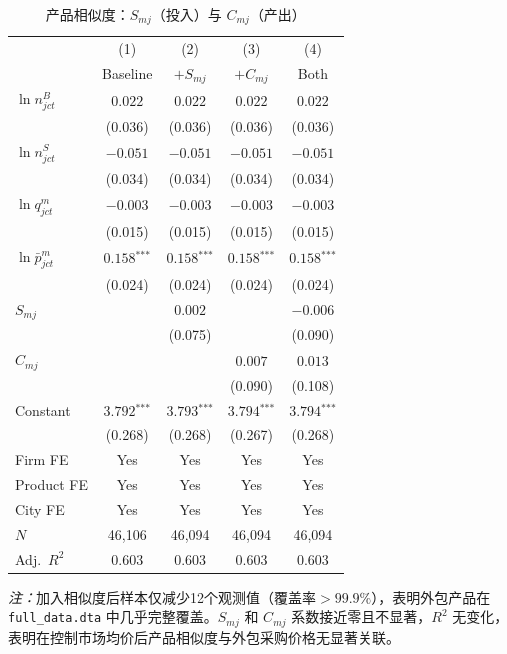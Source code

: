 \documentclass[12pt]{article}
\newcommand{\sym}[1]{\ensuremath{^{\text{#1}}}}
\newcommand{\se}[1]{{\small(#1)}}
\newcommand{\mis}{}
\begin{document}
\begin{table}[H]
\centering\small
\begin{threeparttable}
\caption{产品相似度：$S_{mj}$（投入）与 $C_{mj}$（产出）}
\begin{tabular}{l *{4}{c}}
\toprule
 & (1) & (2) & (3) & (4) \\
 & Baseline & $+S_{mj}$ & $+C_{mj}$ & Both \\
\midrule
$\ln n^{B}_{jct}$
  & $0.022$ & $0.022$ & $0.022$ & $0.022$ \\
  & \se{0.036} & \se{0.036} & \se{0.036} & \se{0.036} \\[3pt]
$\ln n^{S}_{jct}$
  & $-0.051$ & $-0.051$ & $-0.051$ & $-0.051$ \\
  & \se{0.034} & \se{0.034} & \se{0.034} & \se{0.034} \\[3pt]
$\ln q^{m}_{jct}$
  & $-0.003$ & $-0.003$ & $-0.003$ & $-0.003$ \\
  & \se{0.015} & \se{0.015} & \se{0.015} & \se{0.015} \\[3pt]
$\ln\bar{p}^{m}_{jct}$
  & $0.158\sym{***}$ & $0.158\sym{***}$ & $0.158\sym{***}$ & $0.158\sym{***}$ \\
  & \se{0.024} & \se{0.024} & \se{0.024} & \se{0.024} \\[3pt]
$S_{mj}$
  & \mis & $0.002$ & \mis & $-0.006$ \\
  & & \se{0.075} & & \se{0.090} \\[3pt]
$C_{mj}$
  & \mis & \mis & $0.007$ & $0.013$ \\
  & & & \se{0.090} & \se{0.108} \\[3pt]
Constant
  & $3.792\sym{***}$ & $3.793\sym{***}$ & $3.794\sym{***}$ & $3.794\sym{***}$ \\
  & \se{0.268} & \se{0.268} & \se{0.267} & \se{0.268} \\
\midrule
Firm FE    & Yes & Yes & Yes & Yes \\
Product FE & Yes & Yes & Yes & Yes \\
City FE    & Yes & Yes & Yes & Yes \\
$N$        & 46,106 & 46,094 & 46,094 & 46,094 \\
Adj.\ $R^{2}$ & 0.603 & 0.603 & 0.603 & 0.603 \\
\bottomrule
\end{tabular}
\begin{tablenotes}\small
\item \textit{注：}加入相似度后样本仅减少12个观测值（覆盖率$>99.9\%$），表明外包产品在 \texttt{full\_data.dta} 中几乎完整覆盖。$S_{mj}$ 和 $C_{mj}$ 系数接近零且不显著，$R^{2}$ 无变化，表明在控制市场均价后产品相似度与外包采购价格无显著关联。
\end{tablenotes}
\end{threeparttable}
\end{table}
\end{document}
